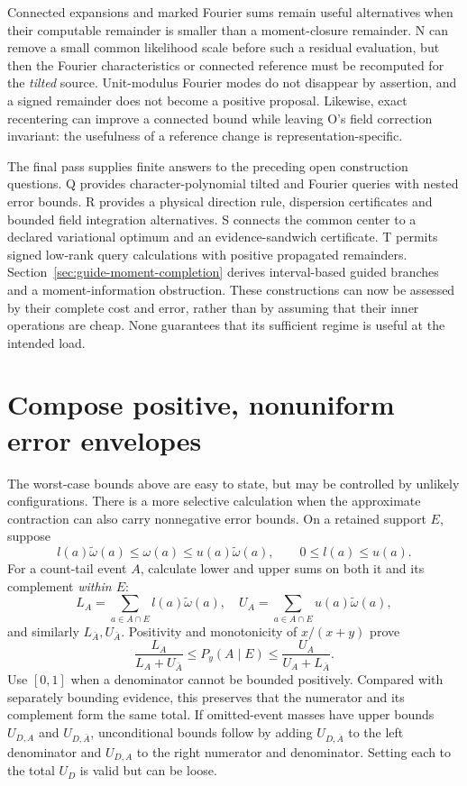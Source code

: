 \documentclass[10pt,a4paper]{article}
\begin{document}
Connected expansions and marked Fourier sums remain useful alternatives when their computable remainder
is smaller than a moment-closure remainder. N can remove a small common likelihood scale before such a
residual evaluation, but then the Fourier characteristics or connected reference must be recomputed for
the \emph{tilted} source. Unit-modulus Fourier modes do not disappear by assertion, and a signed remainder
does not become a positive proposal. Likewise, exact recentering can improve a connected bound while
leaving O's field correction invariant: the usefulness of a reference change is representation-specific.

The final pass supplies finite answers to the preceding open construction questions.
Q provides character-polynomial tilted and Fourier queries with nested error bounds.
R provides a physical direction rule, dispersion certificates and bounded field integration alternatives.
S connects the common center to a declared variational optimum and an evidence-sandwich certificate.
T permits signed low-rank query calculations with positive propagated remainders.
Section~\ref{sec:guide-moment-completion} derives interval-based guided branches and a moment-information
obstruction. These constructions can now be assessed by their complete cost and error, rather than by
assuming that their inner operations are cheap. None guarantees that its sufficient regime is useful
at the intended load.

\clearpage
\section{Compose positive, nonuniform error envelopes}
\label{sec:envelopes}
The worst-case bounds above are easy to state, but may be controlled by unlikely configurations. There is a
more selective calculation when the approximate contraction can also carry nonnegative error bounds.
On a retained support $E$, suppose
\[
 l(a)\widetilde\omega(a)\leq\omega(a)\leq u(a)\widetilde\omega(a),
 \qquad 0\leq l(a)\leq u(a).
\]
For a count-tail event $A$, calculate lower and upper sums on both it and its complement \emph{within $E$}:
\[
 L_A=\sum_{a\in A\cap E}l(a)\widetilde\omega(a),\quad
 U_A=\sum_{a\in A\cap E}u(a)\widetilde\omega(a),
\]
and similarly $L_{\bar A},U_{\bar A}$. Positivity and monotonicity of $x/(x+y)$ prove
\begin{equation}
 \frac{L_A}{L_A+U_{\bar A}}
 \leq P_y(A\mid E)\leq
 \frac{U_A}{U_A+L_{\bar A}}.
 \label{eq:event-envelopes}
\end{equation}
Use $[0,1]$ when a denominator cannot be bounded positively. Compared with separately bounding evidence,
this preserves that the numerator and its complement form the same total. If omitted-event masses have
upper bounds $U_{D,A}$ and $U_{D,\bar A}$, unconditional bounds follow by adding $U_{D,\bar A}$ to the
left denominator and $U_{D,A}$ to the right numerator and denominator. Setting each to the total $U_D$
is valid but can be loose.
\end{document}
